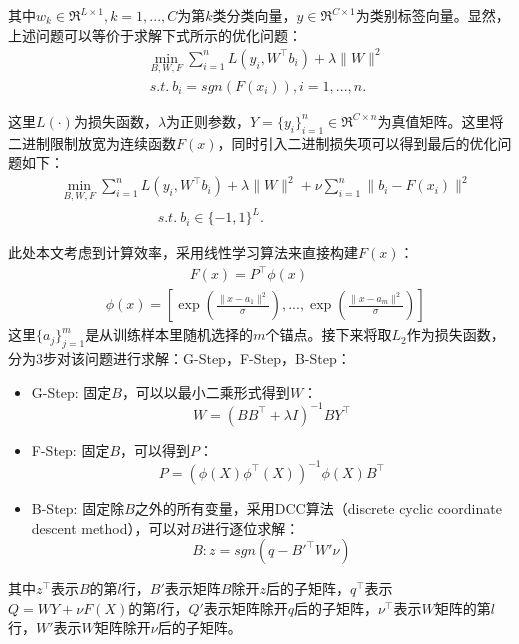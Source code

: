 其中$w_k\in \Re^{L\times 1},k=1,...,C$为第$k$类分类向量，$y\in \Re^{C\times 1}$为类别标签向量。显然，上述问题可以等价于求解下式所示的优化问题：
\begin{equation}
\begin{aligned}
	& \min_{B,W,F} \sum_{i=1}^n L\left(y_i,W^\top b_i\right)+\lambda \|W\|^2 \\
	& \ s.t. \  b_i=sgn\left(F(x_i)\right),i=1,...,n.
\end{aligned}
\end{equation}

这里$L(\cdot)$为损失函数，$\lambda$为正则参数，$Y=\{y_i\}_{i=1}^n\in\Re ^{C\times n}$为真值矩阵。这里将二进制限制放宽为连续函数$F(x)$，同时引入二进制损失项可以得到最后的优化问题如下：
\begin{equation}
\begin{aligned}
	& \min_{B,W,F} \sum_{i=1}^n L\left(y_i,W^\top b_i\right)+\lambda \|W\|^2 + \nu\sum_{i=1}^n \|b_i-F(x_i)\|^2     \\
	& \quad\quad\quad\quad\quad\quad\quad s.t. \  b_i\in\{-1,1\}^L.
\end{aligned}
\end{equation}

此处本文考虑到计算效率，采用线性学习算法来直接构建$F(x)$：
\begin{equation}
\begin{aligned}
	& \quad\quad\quad\quad\quad\quad F(x)=P^\top\phi(x) \\
	& \phi(x)=\left[\exp(\frac{\|x-a_1\|^2}{\sigma}),...,\exp(\frac{\|x-a_m\|^2}{\sigma})\right]
\end{aligned}
\end{equation}
这里$\{a_j\}_{j=1}^m$是从训练样本里随机选择的$m$个锚点。接下来将取$L_2$作为损失函数，分为3步对该问题进行求解：G-Step，F-Step，B-Step：
\begin{itemize}
\item G-Step: 固定$B$，可以以最小二乘形式得到$W$：
\begin{equation}
	W=(BB^\top+\lambda I)^{-1}BY^\top
\end{equation}
\item F-Step: 固定$B$，可以得到$P$：
\begin{equation}
	P=\left(\phi(X)\phi^\top(X)\right)^{-1}\phi(X)B^\top
\end{equation}
\item B-Step: 固定除$B$之外的所有变量，采用DCC算法（discrete cyclic coordinate descent method），可以对$B$进行逐位求解：
\begin{equation}
	B: z=sgn(q-B'^\top W'\nu)
\end{equation}
\end{itemize}
其中$z^\top$表示$B$的第$l$行，$B'$表示矩阵$B$除开$z$后的子矩阵，$q^\top$表示$Q=WY+\nu F(X)$的第$l$行，$Q'$表示矩阵除开$q$后的子矩阵，$\nu^\top$表示$W$矩阵的第$l$行，$W'$表示$W$矩阵除开$\nu$后的子矩阵。

